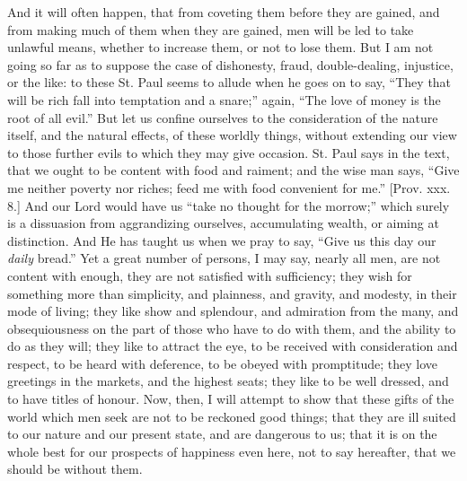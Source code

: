 And it will often happen, that from coveting them before they are
gained, and from making much of them when they are gained, men will be
led to take unlawful means, whether to increase them, or not to lose
them. But I am not going so far as to suppose the case of dishonesty,
fraud, double-dealing, injustice, or the like: to these St. Paul seems
to allude when he goes on to say, ``They that will be rich fall
into temptation and a snare;'' again, ``The love of money is
the root of all evil.'' But let us confine ourselves to the
consideration of the nature itself, and the natural effects, of these
worldly things, without extending our view to those further evils to
which they may give occasion. St. Paul says in the text, that we ought
to be content with food and raiment; and the wise man says, ``Give
me neither poverty nor riches; feed me with food convenient for
me.'' [Prov. xxx. 8.] And our Lord would have us ``take no
thought for the morrow;'' which surely is a dissuasion from
aggrandizing ourselves, accumulating wealth, or aiming at distinction.
And He has taught us when we pray to say, ``Give us this day our \emph{daily}
bread.'' Yet a great number of persons, I may say, nearly all men,
are not content with enough, they are not satisfied with sufficiency;
they wish for something more than simplicity, and plainness, and
gravity, and modesty, in their mode of living; they like show and
splendour, and admiration from the many, and obsequiousness on the
part of those who have to do with them, and the ability to do as they
will; they like to attract the eye, to be received with consideration
and respect, to be heard with deference, to be obeyed with
promptitude; they love greetings in the markets, and the highest
seats; they like to be well dressed, and to have titles of honour.
Now, then, I will attempt to show that these gifts of the world which
men seek are not to be reckoned good things; that they are ill suited
to our nature and our present state, and are dangerous to us; that it
is on the whole best for our prospects of happiness even here, not to
say hereafter, that we should be without them.

